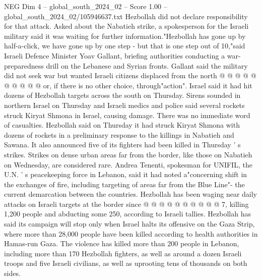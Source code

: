 \begin{textsample}{NEG Dim 4 – global\_south\_2024\_02 – Score 1.00 – global\_south\_2024\_02/105946637.txt}
Hezbollah did not declare responsibility for that attack.
Asked about the Nabatieh strike, a spokesperson for the Israeli military said it was waiting for further information."Hezbollah has gone up by half-a-click, we have gone up by one step - but that is one step out of 10,"said Israeli Defence Minister Yoav Gallant, briefing authorities conducting a war-preparedness drill on the Lebanese and Syrian fronts.
Gallant said the military did not seek war but wanted Israeli citizens displaced from the north @ @ @ @ @ @ @ @ @ @ or, if there is no other choice, through"action".
Israel said it had hit dozens of Hezbollah targets across the south on Thursday.
Sirens sounded in northern Israel on Thursday and Israeli medics and police said several rockets struck Kiryat Shmona in Israel, causing damage.
There was no immediate word of casualties.
Hezbollah said on Thursday it had struck Kiryat Shmona with dozens of rockets in a preliminary response to the killings in Nabatieh and Sawana.
It also announced five of its fighters had been killed in Thursday ' s strikes.
Strikes on dense urban areas far from the border, like those on Nabatieh on Wednesday, are considered rare.
Andrea Tenenti, spokesman for UNIFIL, the U.N. ' s peacekeeping force in Lebanon, said it had noted a"concerning shift in the exchanges of fire, including targeting of areas far from the Blue Line"- the current demarcation between the countries.
Hezbollah has been waging near daily attacks on Israeli targets at the border since @ @ @ @ @ @ @ @ @ @ 7, killing 1,200 people and abducting some 250, according to Israeli tallies.
Hezbollah has said its campaign will stop only when Israel halts its offensive on the Gaza Strip, where more than 28,000 people have been killed according to health authorities in Hamas-run Gaza.
The violence has killed more than 200 people in Lebanon, including more than 170 Hezbollah fighters, as well as around a dozen Israeli troops and five Israeli civilians, as well as uprooting tens of thousands on both sides.

\end{textsample}
